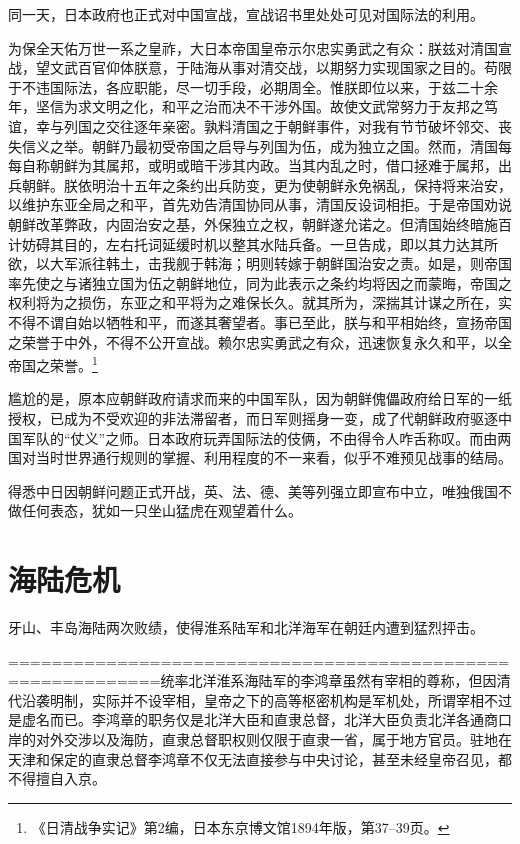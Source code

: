 \documentclass[12pt,UTF8]{ctexbook}
\begin{document}
同一天，日本政府也正式对中国宣战，宣战诏书里处处可见对国际法的利用。

为保全天佑万世一系之皇祚，大日本帝国皇帝示尔忠实勇武之有众：朕兹对清国宣战，望文武百官仰体朕意，于陆海从事对清交战，以期努力实现国家之目的。苟限于不违国际法，各应职能，尽一切手段，必期周全。惟朕即位以来，于兹二十余年，坚信为求文明之化，和平之治而决不干涉外国。故使文武常努力于友邦之笃谊，幸与列国之交往逐年亲密。孰料清国之于朝鲜事件，对我有节节破坏邻交、丧失信义之举。朝鲜乃最初受帝国之启导与列国为伍，成为独立之国。然而，清国每每自称朝鲜为其属邦，或明或暗干涉其内政。当其内乱之时，借口拯难于属邦，出兵朝鲜。朕依明治十五年之条约出兵防变，更为使朝鲜永免祸乱，保持将来治安，以维护东亚全局之和平，首先劝告清国协同从事，清国反设词相拒。于是帝国劝说朝鲜改革弊政，内固治安之基，外保独立之权，朝鲜遂允诺之。但清国始终暗施百计妨碍其目的，左右托词延缓时机以整其水陆兵备。一旦告成，即以其力达其所欲，以大军派往韩土，击我舰于韩海；明则转嫁于朝鲜国治安之责。如是，则帝国率先使之与诸独立国为伍之朝鲜地位，同为此表示之条约均将因之而蒙晦，帝国之权利将为之损伤，东亚之和平将为之难保长久。就其所为，深揣其计谋之所在，实不得不谓自始以牺牲和平，而遂其奢望者。事已至此，朕与和平相始终，宣扬帝国之荣誉于中外，不得不公开宣战。赖尔忠实勇武之有众，迅速恢复永久和平，以全帝国之荣誉。\footnote{《日清战争实记》第2编，日本东京博文馆1894年版，第37--39页。}

尴尬的是，原本应朝鲜政府请求而来的中国军队，因为朝鲜傀儡政府给日军的一纸授权，已成为不受欢迎的非法滞留者，而日军则摇身一变，成了代朝鲜政府驱逐中国军队的“仗义”之师。日本政府玩弄国际法的伎俩，不由得令人咋舌称叹。而由两国对当时世界通行规则的掌握、利用程度的不一来看，似乎不难预见战事的结局。

得悉中日因朝鲜问题正式开战，英、法、德、美等列强立即宣布中立，唯独俄国不做任何表态，犹如一只坐山猛虎在观望着什么。

\section{海陆危机}

牙山、丰岛海陆两次败绩，使得淮系陆军和北洋海军在朝廷内遭到猛烈抨击。

============================================================统率北洋淮系海陆军的李鸿章虽然有宰相的尊称，但因清代沿袭明制，实际并不设宰相，皇帝之下的高等枢密机构是军机处，所谓宰相不过是虚名而已。李鸿章的职务仅是北洋大臣和直隶总督，北洋大臣负责北洋各通商口岸的对外交涉以及海防，直隶总督职权则仅限于直隶一省，属于地方官员。驻地在天津和保定的直隶总督李鸿章不仅无法直接参与中央讨论，甚至未经皇帝召见，都不得擅自入京。
\end{document}
